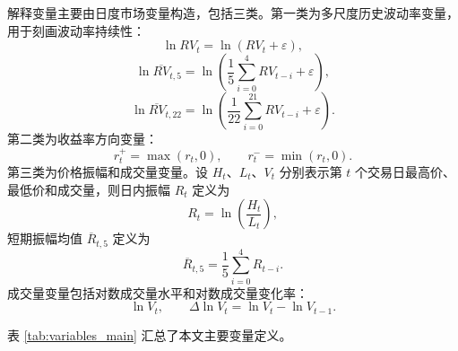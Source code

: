 解释变量主要由日度市场变量构造，包括三类。第一类为多尺度历史波动率变量，用于刻画波动率持续性：
\begin{equation}
	\ln RV_t=\ln(RV_t+\varepsilon),
\end{equation}
\begin{equation}
	\ln \overline{RV}_{t,5}
	=
	\ln\left(\frac{1}{5}\sum_{i=0}^{4}RV_{t-i}+\varepsilon\right),
\end{equation}
\begin{equation}
	\ln \overline{RV}_{t,22}
	=
	\ln\left(\frac{1}{22}\sum_{i=0}^{21}RV_{t-i}+\varepsilon\right).
\end{equation}
第二类为收益率方向变量：
\begin{equation}
	r_t^{+}=\max(r_t,0),\qquad
	r_t^{-}=\min(r_t,0).
\end{equation}
第三类为价格振幅和成交量变量。设 \(H_t\)、\(L_t\)、\(V_t\) 分别表示第 \(t\) 个交易日最高价、最低价和成交量，则日内振幅 $R_t$ 定义为
\begin{equation}
	R_t=\ln\left(\frac{H_t}{L_t}\right),
\end{equation}
短期振幅均值 $\overline{R}_{t,5}$ 定义为
\begin{equation}
	\overline{R}_{t,5}
	=
	\frac{1}{5}\sum_{i=0}^{4}R_{t-i}.
\end{equation}
成交量变量包括对数成交量水平和对数成交量变化率：
\begin{equation}
	\ln V_t,\qquad
	\Delta \ln V_t=\ln V_t-\ln V_{t-1}.
\end{equation}

表 \ref{tab:variables_main} 汇总了本文主要变量定义。

